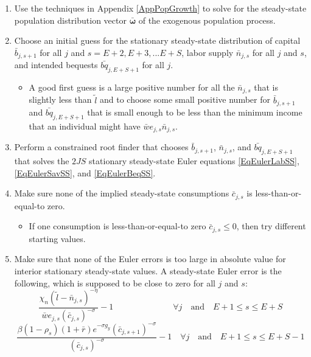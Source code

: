 \documentclass[letterpaper,12pt]{article}
\theoremstyle{definition}
\begin{document}
  \begin{enumerate}
    \item Use the techniques in Appendix \ref{AppPopGrowth} to solve for the steady-state population distribution vector $\bm{\bar{\omega}}$ of the exogenous population process.
    \item Choose an initial guess for the stationary steady-state distribution of capital $\bar{b}_{j,s+1}$ for all $j$ and $s=E+2,E+3,...E+S$, labor supply $\bar{n}_{j,s}$ for all $j$ and $s$, and intended bequests $\bar{bq}_{j,E+S+1}$ for all $j$.
      \begin{itemize}
        \item A good first guess is a large positive number for all the $\bar{n}_{j,s}$ that is slightly less than $\tilde{l}$ and to choose some small positive number for $\bar{b}_{j,s+1}$ and $\bar{bq}_{j,E+S+1}$ that is small enough to be less than the minimum income that an individual might have $\bar{w}e_{j,s}\bar{n}_{j,s}$.
      \end{itemize}
    \item Perform a constrained root finder that chooses $\bar{b}_{j,s+1}$, $\bar{n}_{j,s}$, and $\bar{bq}_{j,E+S+1}$ that solves the $2JS$ stationary steady-state Euler equations \eqref{EqEulerLabSS}, \eqref{EqEulerSavSS}, and \eqref{EqEulerBeqSS}.
    \item Make sure none of the implied steady-state consumptions $\bar{c}_{j,s}$ is less-than-or-equal-to zero.
      \begin{itemize}
        \item If one consumption is less-than-or-equal-to zero $\bar{c}_{j,s}\leq 0$, then try different starting values.
      \end{itemize}
    \item Make sure that none of the Euler errors is too large in absolute value for interior stationary steady-state values. A steady-state Euler error is the following, which is supposed to be close to zero for all $j$ and $s$:
      \begin{equation}\label{EqSSeulerrLab}
        \frac{\chi_n\left(\tilde{l}-\bar{n}_{j,s}\right)^{-\eta}}{\bar{w}e_{j,s}\left(\bar{c}_{j,s}\right)^{-\sigma}} - 1 \quad\quad\quad\quad\quad\quad\quad\forall j\quad\text{and}\quad E+1\leq s\leq E+S
      \end{equation}
      \begin{equation}\label{EqSSeulerrSav}
        \frac{\beta\left(1-\rho_s\right)\left(1+\bar{r}\right)e^{-\sigma g_y}\left(\bar{c}_{j,s+1}\right)^{-\sigma}}{\left(\bar{c}_{j,s}\right)^{-\sigma}} - 1 \quad\forall j\quad\text{and}\quad E+1\leq s\leq E+S-1

\end{equation}
\end{enumerate}
\end{document}
